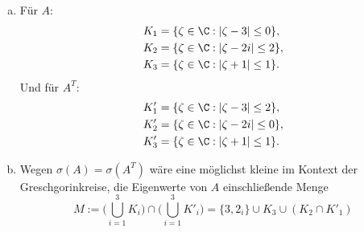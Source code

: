 \documentclass{mywork}
\begin{document}
\begin{aufgabe}
	\begin{enumerate}[a)]
		\item
			Für $A$:
			\begin{align*}
				K_1 &= \{ \zeta \in \C : | \zeta - 3 | \le 0 \}, \\
				K_2 &= \{ \zeta \in \C : | \zeta - 2i | \le 2 \}, \\
				K_3 &= \{ \zeta \in \C : | \zeta + 1 | \le 1 \}.
			\end{align*}
			Und für $A^T$:
			\begin{align*}
				K_1' &= \{ \zeta \in \C : | \zeta - 3 | \le 2 \}, \\
				K_2' &= \{ \zeta \in \C : | \zeta - 2i | \le 0 \}, \\
				K_3' &= \{ \zeta \in \C : | \zeta + 1 | \le 1 \}.
			\end{align*}
		\item
			Wegen $\sigma(A) = \sigma(A^T)$ wäre eine möglichst kleine im Kontext der Greschgorinkreise, die Eigenwerte von $A$ einschließende Menge
			\[
				M := \Bigg (\bigcup_{i=1}^3 K_i\Bigg ) \cap \Bigg (\bigcup_{i=1}^3 K'_i\Bigg ) = \{3, 2_i\} \cup K_3\cup (K_2 \cap K'_1)
			\]
	\end{enumerate}
\end{aufgabe}
\end{document}
